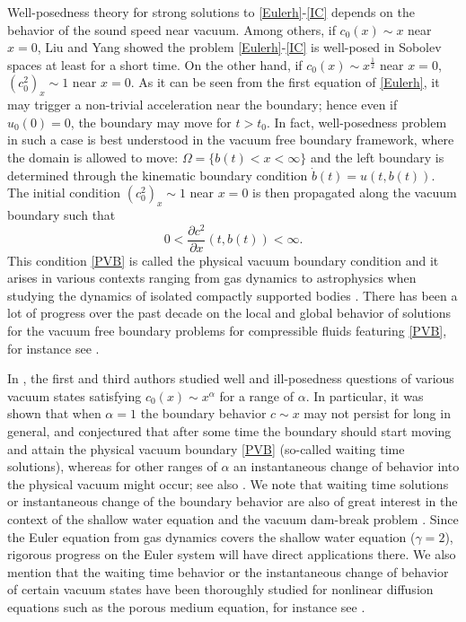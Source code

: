 \documentclass{article}
\def\be{\begin{equation}}
\def\ee{\end{equation}}
\numberwithin{equation}{section}
\begin{document}
Well-posedness theory for strong solutions to \eqref{Eulerh}-\eqref{IC} depends on the behavior of  the sound speed near vacuum. Among others, if $ c_0(x) \sim x $ near $x=0$, Liu and Yang \cite{LY} showed the problem \eqref{Eulerh}-\eqref{IC} is  well-posed in Sobolev spaces at least for a short time. On the other hand, if $c_0(x) \sim x^\frac12$ near $x=0$, $(c_0^2)_x\sim 1$ near $x=0$. As it can be seen from the first equation of  \eqref{Eulerh}, it may trigger a non-trivial acceleration near the boundary; hence even if $u_0(0)=0$, the boundary may  move for $t>t_0$. In fact, well-posedness problem in such a case is best understood in the vacuum free boundary framework, where the domain is allowed to move: $\Omega =\{ b(t)<x<\infty\}$ and the left boundary is determined through the kinematic boundary condition $\dot b (t)= u(t, b(t))$. The initial condition $(c_0^2)_x\sim 1$ near $x=0$ is then propagated along the vacuum boundary such that 
\be\label{PVB}
0<\frac{\partial c^2}{ \partial x}(t,b(t)) <\infty . 
\ee
 This condition \eqref{PVB} is called  the physical vacuum boundary condition and it  arises  in various contexts ranging from gas dynamics to astrophysics when studying the dynamics of isolated compactly supported bodies \cite{CoSh2012, Jang2014, JM, LXZ, Sideris17}. There has been a lot of progress over the past decade on the local and global behavior of solutions for the vacuum free boundary problems for compressible fluids featuring \eqref{PVB}, for instance see  \cite{CoSh2012, GHJ2021a, HaJa2018-1, HaJa2016-2, HaJa2017,  IfTa2020, JaMa2009, JaMa2015}. 

In \cite{JM},  the first and third authors studied well and ill-posedness questions of various vacuum states satisfying $ c_0(x) \sim x^\alpha $ for a range of $\alpha$. 
In particular, it was shown that when $\alpha=1$ 
the boundary behavior $ c \sim x $ may not persist for long in general, and conjectured that after some time the boundary should start moving and attain the physical vacuum boundary \eqref{PVB} (so-called waiting time solutions), whereas for other ranges of $\alpha$ an instantaneous change of behavior into the physical vacuum might occur; see also \cite{LY1}. 
We note that waiting time solutions or instantaneous change of the boundary behavior are also of great interest in the context of the shallow water equation and the vacuum dam-break problem \cite{Camassa20,GB}. Since the Euler equation from gas dynamics covers the shallow water equation ($\gamma=2$), rigorous progress on the Euler system will have direct applications there. We also mention that the waiting
time behavior or the instantaneous change of behavior  of certain vacuum states have been thoroughly studied for nonlinear diffusion equations such
as the porous medium equation, for instance see \cite{CF1979,Knerr1977}. 
\end{document}
